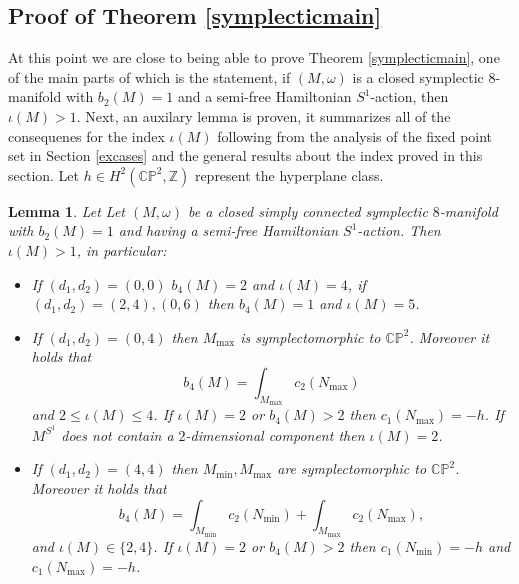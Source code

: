 \documentclass[12pt]{article}
\newtheorem{lemma}[theorem]{Lemma}
\begin{document}
\subsection{Proof of Theorem \ref{symplecticmain}}
At this point we are close to being able to prove Theorem \ref{symplecticmain}, one of the main parts of which is the statement, if $(M,\omega)$ is a closed symplectic $8$-manifold with $b_{2}(M)=1$ and a semi-free Hamiltonian $S^1$-action, then $\iota(M)>1$. Next, an auxilary lemma is proven, it summarizes all of the consequenes for the index $\iota(M)$ following from the analysis of the fixed point set in Section \ref{excases} and the general results about the index proved in this section.  Let $h \in H^2(\mathbb{CP}^2,\mathbb{Z})$ represent the hyperplane class.

\begin{lemma} \label{squares}
Let Let $(M,\omega)$ be a closed  simply connected symplectic $8$-manifold with $b_{2}(M)=1$ and having a semi-free Hamiltonian $S^1$-action. Then $\iota(M) > 1$, in particular:\begin{itemize}\item[a).] If $(d_1,d_2) = (0,0)$ $b_{4}(M)=2$ and $\iota(M)=4$, if $(d_1,d_2) = (2,4),(0,6)$ then $b_{4}(M) =1$ and $\iota(M) = 5$.
\item[b).] If $(d_1,d_2) = (0,4)$ then $M_{\max}$ is symplectomorphic to $\mathbb{CP}^2$. Moreover it holds that $$b_{4}(M) = \int_{M_{\max}} c_{2}(N_{\max})$$ and $2 \leq \iota(M) \leq 4$. If $\iota(M) = 2$ or $b_{4}(M) >2$ then $c_{1}(N_{\max}) = -h$. If $M^{S^1}$ does not contain a $2$-dimensional component then $\iota(M)=2$.
\item[c).] If $(d_1,d_2) =(4,4)$ then $M_{\min},M_{\max}$ are symplectomorphic to $\mathbb{CP}^2$. Moreover it holds that $$b_{4}(M) =  \int_{M_{\min}} c_{2}(N_{\min}) +  \int_{M_{\max}} c_{2}(N_{\max}),$$ and $\iota(M) \in \{2,4\}$. If $\iota(M)=2$ or $b_{4}(M) > 2$ then $c_{1}(N_{\min}) = -h$ and $c_{1}(N_{\max}) = -h$. 
\end{itemize}
\end{lemma}
\end{document}
